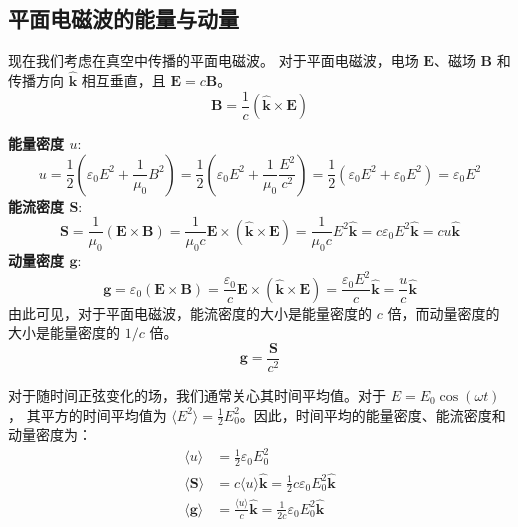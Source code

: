 \documentclass[fontset=none]{ctexart}
\begin{document}
\subsection{平面电磁波的能量与动量}
现在我们考虑在真空中传播的平面电磁波。
对于平面电磁波，电场 $\bm{E}$、磁场 $\bm{B}$ 和传播方向 $\hat{\bm{k}}$ 相互垂直，且 $\bm{E} = c\bm{B}$。
\begin{equation}
    \bm{B} = \frac{1}{c}(\hat{\bm{k}} \times \bm{E})
\end{equation}

\textbf{能量密度 $u$}:
\begin{equation}
    u = \frac{1}{2}(\varepsilon_0 E^2 + \frac{1}{\mu_0}B^2) 
    = \frac{1}{2}\left(\varepsilon_0 E^2 + \frac{1}{\mu_0}\frac{E^2}{c^2}\right) 
    = \frac{1}{2}(\varepsilon_0 E^2 + \varepsilon_0 E^2) = \varepsilon_0 E^2
\end{equation}
\textbf{能流密度 $\bm{S}$}:
\begin{equation}
    \bm{S} = \frac{1}{\mu_0}(\bm{E} \times \bm{B}) 
    = \frac{1}{\mu_0 c}\bm{E} \times (\hat{\bm{k}} \times \bm{E}) 
    = \frac{1}{\mu_0 c} E^2 \hat{\bm{k}} = c \varepsilon_0 E^2 \hat{\bm{k}} = c u \hat{\bm{k}}
\end{equation}
\textbf{动量密度 $\bm{g}$}:
\begin{equation}
    \bm{g} = \varepsilon_0(\bm{E} \times \bm{B}) 
    = \frac{\varepsilon_0}{c}\bm{E} \times (\hat{\bm{k}} \times \bm{E}) 
    = \frac{\varepsilon_0 E^2}{c}\hat{\bm{k}} = \frac{u}{c}\hat{\bm{k}}
\end{equation}
由此可见，对于平面电磁波，能流密度的大小是能量密度的 $c$ 倍，而动量密度的大小是能量密度的 $1/c$ 倍。
\begin{equation}
    \bm{g} = \frac{\bm{S}}{c^2}
\end{equation}

对于随时间正弦变化的场，我们通常关心其时间平均值。对于 $E = E_0 \cos(\omega t)$，
其平方的时间平均值为 $\langle E^2 \rangle = \frac{1}{2}E_0^2$。因此，时间平均的能量密度、能流密度和动量密度为：
\begin{equation}
\begin{aligned}
    \langle u \rangle &= \frac{1}{2}\varepsilon_0 E_0^2 \\
    \langle \bm{S} \rangle &= c \langle u \rangle \hat{\bm{k}} 
    = \frac{1}{2}c\varepsilon_0 E_0^2 \hat{\bm{k}} \\
    \langle \bm{g} \rangle &= \frac{\langle u \rangle}{c} \hat{\bm{k}} 
    = \frac{1}{2c}\varepsilon_0 E_0^2 \hat{\bm{k}}
\end{aligned}
\end{equation}
\end{document}
